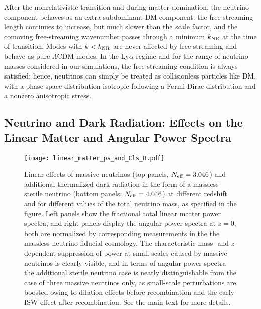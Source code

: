 \documentclass{emulateapj}
\begin{document}
After the nonrelativistic transition and during matter domination, the neutrino component behaves as an extra subdominant 
DM component: the free-streaming length continues to increase, but much slower than the scale factor, and
the comoving free-streaming wavenumber passes through a minimum $k_{\rm NR}$ at the time of transition.
Modes with $k <k_{\rm NR}$ are never affected by free streaming and behave as pure $\Lambda$CDM modes.
In the Ly$\alpha$ regime and for the range of neutrino masses considered in our simulations,   the free-streaming condition is always satisfied; hence,
neutrinos can simply be treated as collisionless particles like DM, with a 
phase space distribution   isotropic  following a Fermi-Dirac distribution and a nonzero anisotropic stress.
 

\subsection{Neutrino and Dark Radiation: Effects on the Linear Matter and Angular Power Spectra}


\begin{figure}
\centering
\texttt{[image: linear\_matter\_ps\_and\_Cls\_B.pdf]}
\caption{Linear effects of massive neutrinos (top panels, $N_{\rm eff} =3.046$) and additional thermalized dark radiation in the form of a massless sterile neutrino (bottom panels; $N_{\rm eff} =4.046$)
 at different redshift and for different values of the total neutrino mass, as specified in the figure.  
Left panels show the fractional total linear matter power spectra, and right panels display the angular power spectra at $z=0$; both are normalized by corresponding measurements in
the the massless neutrino fiducial cosmology. 
The characteristic mass- and $z$-dependent suppression of power at small scales caused by massive neutrinos
is clearly visible, and in terms of angular power spectra the additional
sterile neutrino case  is  neatly  distinguishable from the case of three massive neutrinos only, as
small-scale perturbations are boosted owing to dilation effects before recombination and the early ISW effect after recombination.
See the main text for more details.}
\label{fig_nu_linear_1}
\end{figure} 

 
\end{document}
